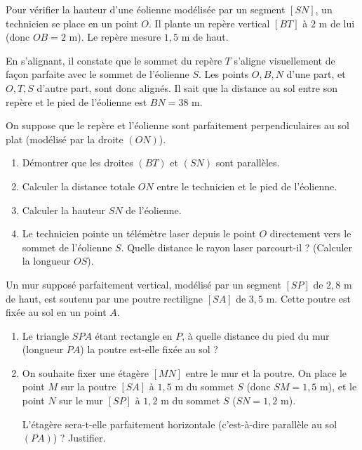 \documentclass[a4paper]{book}
\begin{document}
    
    \begin{exercice}
        Pour vérifier la hauteur d'une éolienne modélisée par un segment $[SN]$, un technicien se place en un point $O$. Il plante un repère vertical $[BT]$ à $2$ m de lui (donc $OB = 2$ m). Le repère mesure $1,5$ m de haut.
        
        En s'alignant, il constate que le sommet du repère $T$ s'aligne visuellement de façon parfaite avec le sommet de l'éolienne $S$. Les points $O, B, N$ d'une part, et $O, T, S$ d'autre part, sont donc alignés.
        Il sait que la distance au sol entre son repère et le pied de l'éolienne est $BN = 38$ m.
        
        On suppose que le repère et l'éolienne sont parfaitement perpendiculaires au sol plat (modélisé par la droite $(ON)$).
        
        \begin{enumerate}
            \item Démontrer que les droites $(BT)$ et $(SN)$ sont parallèles.
            \item Calculer la distance totale $ON$ entre le technicien et le pied de l'éolienne.
            \item Calculer la hauteur $SN$ de l'éolienne.
            \item Le technicien pointe un télémètre laser depuis le point $O$ directement vers le sommet de l'éolienne $S$. Quelle distance le rayon laser parcourt-il ? (Calculer la longueur $OS$).
        \end{enumerate}
    \end{exercice}
    
    
    \begin{exercice}
        Un mur supposé parfaitement vertical, modélisé par un segment $[SP]$ de $2,8$ m de haut, est soutenu par une poutre rectiligne $[SA]$ de $3,5$ m. Cette poutre est fixée au sol en un point $A$. 
        
        \begin{enumerate}
            \item Le triangle $SPA$ étant rectangle en $P$, à quelle distance du pied du mur (longueur $PA$) la poutre est-elle fixée au sol ?
            \item On souhaite fixer une étagère $[MN]$ entre le mur et la poutre. 
            On place le point $M$ sur la poutre $[SA]$ à $1,5$ m du sommet $S$ (donc $SM = 1,5$ m), et le point $N$ sur le mur $[SP]$ à $1,2$ m du sommet $S$ ($SN = 1,2$ m). 
            
            L'étagère sera-t-elle parfaitement horizontale (c'est-à-dire parallèle au sol $(PA)$) ? Justifier.
        \end{enumerate}
    \end{exercice}
    
\end{document}
